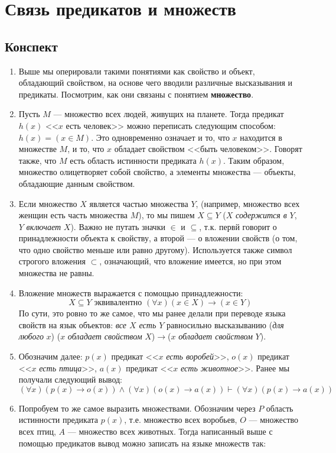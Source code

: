 \section{Связь предикатов и множеств}

\subsection*{Конспект}
\begin{enumerate}
\item Выше мы оперировали такими понятиями как свойство и объект, обладающий свойством, на основе чего вводили различные высказывания и предикаты. Посмотрим, как они связаны с понятием \textbf{множество}.
\item Пусть $M$ --- множество всех людей, живущих на планете. Тогда предикат $h(x)$ <<$x$ есть человек>> можно переписать следующим способом: $h(x)=(x\in M)$. Это одновременно означает и то, что $x$ находится в множестве $M$, и то, что $x$ обладает свойством <<быть человеком>>. Говорят также, что $M$ есть область истинности предиката $h(x)$. Таким образом, множество олицетворяет собой свойство, а элементы множества --- объекты, обладающие данным свойством.
\item Если множество $X$ является частью множества $Y$, (например, множество всех женщин есть часть множества $M$), то мы пишем $X\subseteq Y$ ($X$ \textit{содержится в} $Y$, $Y$ \textit{включает} $X$). Важно не путать значки $\in$ и $\subseteq$, т.к. первй говорит о принадлежности объекта к свойству, а второй --- о вложении свойств (о том, что одно свойство меньше или равно другому). Используется также символ строгого вложения $\subset$, означающий, что вложение имеется, но при этом множества не равны.
\item Вложение множеств выражается с помощью принадлежности:
$$
X\subseteq Y\mbox{ эквивалентно }(\forall x) (x\in X)\to(x\in Y)
$$
По сути, это ровно то же самое, что мы ранее делали при переводе языка свойств на язык объектов: \textit{все $X$ есть $Y$} равносильно высказыванию (\textit{для любого} $x$) ($x$ \textit{обладает свойством} $X$)$\to$($x$ \textit{обладает свойством} $Y$).
\item Обозначим далее: $p(x)$ предикат <<$x$ \textit{есть воробей}>>, $o(x)$ предикат <<$x$ \textit{есть птица}>>, $a(x)$ предикат <<$x$ \textit{есть животное}>>. Ранее мы получали следующий вывод:
$$
(\forall x) (p(x)\to o(x))\land (\forall x) (o(x)\to a(x))\vdash(\forall x) (p(x)\to a(x))
$$
\item Попробуем то же самое выразить множествами. Обозначим через $P$ область истинности предиката $p(x)$, т.е. множество всех воробьев, $O$ --- множество всех птиц, $A$ --- множество всех животных. Тогда написанный выше с помощью предикатов вывод можно записать на языке множеств так:

\end{enumerate}

